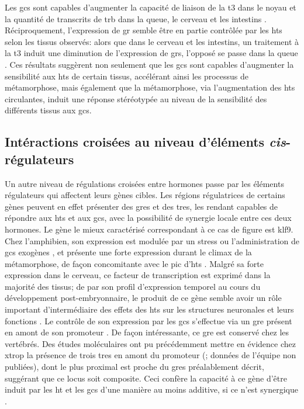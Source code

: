 \documentclass[../main.tex]{subfiles}
\begin{document}
Les \glspl{gc} sont capables d'augmenter la capacité de liaison de la \gls{t3} dans le noyau \citep{Kikuyama1983} et la quantité de transcrits de \gls{trb} dans la queue, le cerveau et les intestins \citep{Bonett2010}.
Réciproquement, l'expression de \gls{gr} semble être en partie contrôlée par les \glspl{ht} selon les tissus observés: alors que dans le cerveau et les intestins, un traitement à la \gls{t3} induit une diminution de l'expression de \glspl{gr}, l'opposé se passe dans la queue \citep{Krain2004}.
Ces résultats suggèrent non seulement que les \glspl{gc} sont capables d'augmenter la sensibilité aux \glspl{ht} de certain tissus, accélérant ainsi les processus de métamorphose, mais également que la métamorphose, via l'augmentation des \glspl{ht} circulantes, induit une réponse stéréotypée au niveau de la sensibilité des différents tissus aux \glspl{gc}.

\subsection{Intéractions croisées au niveau d'éléments \textit{cis}-régulateurs}
Un autre niveau de régulations croisées entre hormones passe par les éléments régulateurs qui affectent leurs gènes cibles.
Les régions régulatrices de certains gènes peuvent en effet présenter des \glspl{gre} et des \glspl{tre}, les rendant capables de répondre aux \glspl{ht} et aux \glspl{gc}, avec la possibilité de synergie locale entre ces deux hormones.
Le gène le mieux caractérisé correspondant à ce cas de figure est \gls{klf9}.
Chez l'amphibien, son expression est modulée par un stress ou l'administration de \glspl{gc} exogènes \citep{Bonett2009}, et présente une forte expression durant le climax de la métamorphose, de façon concomitante avec le pic d'\glspl{ht} \citep{Das2009}.
Malgré sa forte expression dans le cerveau, ce facteur de transcription est exprimé dans la majorité des tissus; de par son profil d'expression temporel au cours du développement post-embryonnaire, le produit de ce gène semble avoir un rôle important d'intermédiaire des effets des \glspl{ht} sur les structures neuronales et leurs fonctions \citep{Denver1999,Cayrou2002}.
Le contrôle de son expression par les \glspl{gc} s'effectue via un \gls{gre} présent en amont de son promoteur \citep{Bagamasbad2012}.
De façon intéressante, ce \gls{gre} est conservé chez les vertébrés.
Des études moléculaires ont pu précédemment mettre en évidence chez \gls{xtrop} la présence de trois \glspl{tre} en amont du promoteur (\citealp{Furlow2002}; données de l'équipe non publiées), dont le plus proximal est proche du \glspl{gre} préalablement décrit, suggérant que ce locus soit composite.
Ceci confère la capacité à ce gène d'être induit par les \gls{ht} et les \glspl{gc} d'une manière au moins additive, si ce n'est synergique \citep{Bonett2010}.
\end{document}
